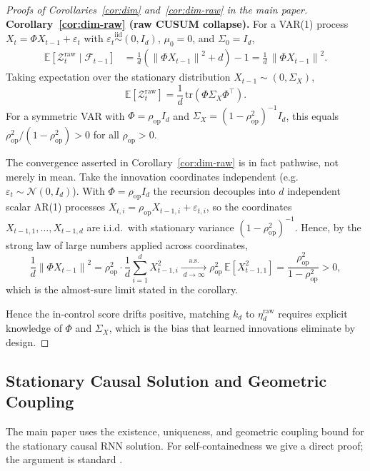 \documentclass[bj,authoryear]{imsart}
\theoremstyle{plain}
\theoremstyle{definition}
\newcommand{\E}{\mathbb{E}}
\newcommand{\F}{\mathcal{F}}
\newcommand{\norm}[1]{\left\lVert #1 \right\rVert}
\newcommand{\given}{\mid}
\newcommand{\iid}{\overset{\mathrm{iid}}{\sim}}
\begin{document}
\begin{proof}[Proofs of Corollaries~\ref{cor:dim} and~\ref{cor:dim-raw} in the main paper]
  \textbf{Corollary~\ref{cor:dim-raw} (raw CUSUM collapse).}
  For a VAR(1) process $X_t = \Phi X_{t-1} + \varepsilon_t$ with
  $\varepsilon_t \iid (0, I_d)$, $\mu_0 = 0$, and $\Sigma_0 = I_d$,
  \begin{align*}
    \E\!\left[\mathcal{Z}_t^{\mathrm{raw}}\given\F_{t-1}\right]
    &= \frac{1}{d}\!\left(\norm{\Phi X_{t-1}}^2 + d\right) - 1
     = \frac{1}{d}\,\norm{\Phi X_{t-1}}^2.
  \end{align*}
  Taking expectation over the stationary distribution $X_{t-1} \sim (0, \Sigma_X)$,
  \[
    \E\!\left[\mathcal{Z}_t^{\mathrm{raw}}\right]
    = \frac{1}{d}\,\mathrm{tr}(\Phi\Sigma_X\Phi^\top).
  \]
  For a symmetric VAR with $\Phi = \rho_{\mathrm{op}} I_d$ and
  $\Sigma_X = (1-\rho_{\mathrm{op}}^2)^{-1}I_d$, this equals
  $\rho_{\mathrm{op}}^2/(1-\rho_{\mathrm{op}}^2) > 0$ for all $\rho_{\mathrm{op}} > 0$.

  The convergence asserted in Corollary~\ref{cor:dim-raw} is in fact pathwise,
  not merely in mean.  Take the innovation coordinates independent (e.g.\
  $\varepsilon_t\sim\mathcal N(0,I_d)$).  With $\Phi=\rho_{\mathrm{op}}I_d$ the
  recursion decouples into $d$ independent scalar AR(1) processes
  $X_{t,i}=\rho_{\mathrm{op}}X_{t-1,i}+\varepsilon_{t,i}$, so the coordinates
  $X_{t-1,1},\ldots,X_{t-1,d}$ are i.i.d.\ with stationary variance
  $(1-\rho_{\mathrm{op}}^2)^{-1}$.  Hence, by the strong law of large numbers
  applied across coordinates,
  \[
    \frac{1}{d}\norm{\Phi X_{t-1}}^2
      = \rho_{\mathrm{op}}^2\cdot\frac{1}{d}\sum_{i=1}^{d}X_{t-1,i}^2
      \xrightarrow[\;d\to\infty\;]{\text{a.s.}}
      \rho_{\mathrm{op}}^2\,\E[X_{t-1,1}^2]
      = \frac{\rho_{\mathrm{op}}^2}{1-\rho_{\mathrm{op}}^2}>0,
  \]
  which is the almost-sure limit stated in the corollary.

  Hence the in-control score drifts positive, matching $k_d$ to
  $\eta_d^{\mathrm{raw}}$ requires explicit knowledge of $\Phi$ and $\Sigma_X$,
  which is the bias that learned innovations eliminate by design.
\end{proof}

\subsection{Stationary Causal Solution and Geometric Coupling}
\label{app:stationary-causal}

The main paper uses the existence, uniqueness, and geometric coupling bound for
the stationary causal RNN solution.  For self-containedness we give a direct
proof; the argument is standard \citep{doukhan1994mixing}.
\end{document}
